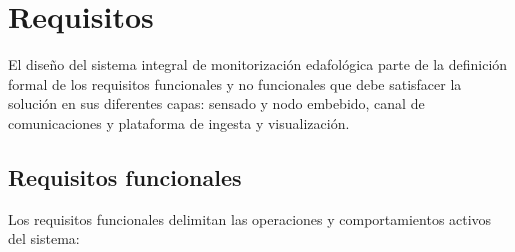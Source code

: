 
\section{Requisitos}

El diseño del sistema integral de monitorización edafológica parte de la definición formal de los requisitos funcionales y no funcionales que debe satisfacer la solución en sus diferentes capas: sensado y nodo embebido, canal de comunicaciones y plataforma de ingesta y visualización.

\subsection{Requisitos funcionales}
Los requisitos funcionales delimitan las operaciones y comportamientos activos del sistema:

